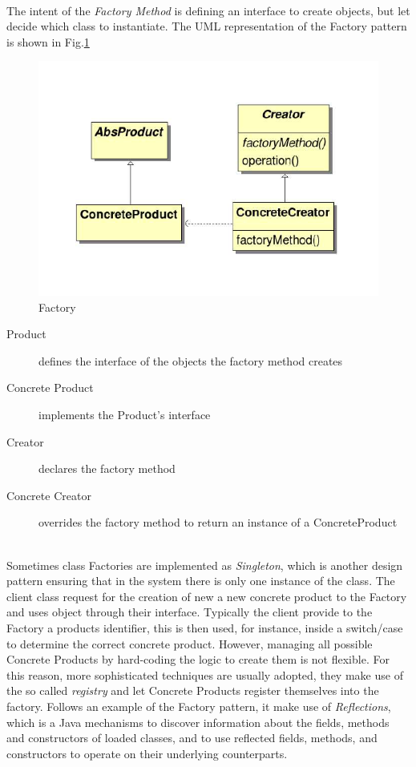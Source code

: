 \paragraph{} The intent of the \textit{Factory Method} is defining an interface to create objects, but let  decide which class to instantiate. The UML representation of the Factory pattern is shown in Fig.\ref{fig:factory}

\begin{figure}[h]
\centering
\includegraphics[width=.7\textwidth]{Figs/factory2.png}
\caption{Factory}
\label{fig:factory}
\end{figure}

\begin{description}
\item[Product] defines the interface of the objects the factory method creates
\item[Concrete Product] implements the Product's interface
\item[Creator]declares the factory method
\item[Concrete Creator] overrides the factory method to return an instance of a
ConcreteProduct
\end{description}
\noindent
\\
Sometimes class Factories are implemented as \textit{Singleton}, which is another design pattern ensuring that in the system there is only one instance of the class. The client class request for the creation of new a new concrete product to the Factory and uses object through their interface. Typically the client provide to the Factory a products identifier, this is then used, for instance, inside a switch/case to determine the correct concrete product. However, managing all possible Concrete Products by hard-coding the logic to create them is not flexible. For this reason, more sophisticated techniques are usually adopted, they make use of the so called \textit{registry} and let Concrete Products register themselves into the factory. Follows an example of the Factory pattern, it make use of \textit{Reflections}, which is a Java mechanisms to discover information about the fields, methods and constructors of loaded classes, and to use reflected fields, methods, and constructors to operate on their underlying counterparts.

